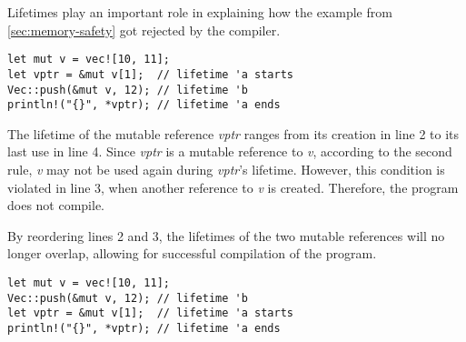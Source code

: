 \documentclass[sigplan,11pt,nonacm]{acmart}
\begin{document}
Lifetimes play an important role in explaining how the example from \ref{sec:memory-safety} got rejected by the compiler.

\begin{lstlisting}
let mut v = vec![10, 11];
let vptr = &mut v[1];  // lifetime 'a starts
Vec::push(&mut v, 12); // lifetime 'b
println!("{}", *vptr); // lifetime 'a ends
\end{lstlisting}

The lifetime of the mutable reference \emph{vptr} ranges from its creation in line 2 to its last use in line 4.
Since \emph{vptr} is a mutable reference to \emph{v}, according to the second rule, \emph{v} may not be used again during \emph{vptr}'s lifetime.
However, this condition is violated in line 3, when another reference to \emph{v} is created.
Therefore, the program does not compile.

By reordering lines 2 and 3, the lifetimes of the two mutable references will no longer overlap, allowing for successful compilation of the program.
\begin{lstlisting}
let mut v = vec![10, 11];
Vec::push(&mut v, 12); // lifetime 'b
let vptr = &mut v[1];  // lifetime 'a starts
println!("{}", *vptr); // lifetime 'a ends
\end{lstlisting}







\end{document}
